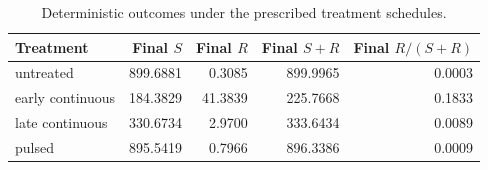 \begin{table}
\caption{Deterministic outcomes under the prescribed treatment schedules.}
\label{tab:round1_deterministic_outcomes}
\begin{tabular}{lrrrr}
\toprule
Treatment & Final $S$ & Final $R$ & Final $S+R$ & Final $R/(S+R)$ \\
\midrule
untreated & 899.6881 & 0.3085 & 899.9965 & 0.0003 \\
early continuous & 184.3829 & 41.3839 & 225.7668 & 0.1833 \\
late continuous & 330.6734 & 2.9700 & 333.6434 & 0.0089 \\
pulsed & 895.5419 & 0.7966 & 896.3386 & 0.0009 \\
\bottomrule
\end{tabular}
\end{table}
